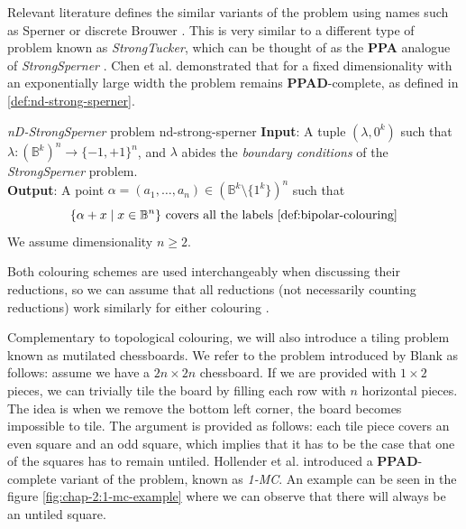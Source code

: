 Relevant literature defines the similar variants of the problem using names such as Sperner or discrete Brouwer 
\cite{chen_SettlingComplexityComputing_2009, chen_Complexity2DDiscrete_2009, daskalakis_ComplexityComputingNash_2006, deligkas_PureCircuitTightInapproximability_2024}.
This is very similar to a different type of problem known as \textit{StrongTucker}, which can be thought of as the
\textbf{PPA} analogue of \textit{StrongSperner} \cite{papadimitriou_ComplexityParityArgument_1994,aisenberg_2DTuckerPPA_2020}.
Chen et al. \cite{chen_SettlingComplexityComputing_2009} demonstrated that for a fixed
dimensionality with an exponentially large width the problem remains \textbf{PPAD}-complete,
as defined in \ref{def:nd-strong-sperner}.


\begin{definitionbox}{\textit{nD-StrongSperner} problem \cite{chen_SettlingComplexityComputing_2009,chen_Complexity2DDiscrete_2009}}{nd-strong-sperner}
    \textbf{Input}: A tuple $(\lambda,0^k)$ such that
    $\lambda : (\mathbb{B}^k)^n \to \{-1, +1\}^n$, and $\lambda$ abides the \textit{boundary conditions}
    of the \textit{StrongSperner} problem.\\
    \textbf{Output}: A point $\alpha = (a_1, \hdots, a_n) \in (\mathbb{B}^k \setminus \{1^k\})^n$ such that
    $$
        \{\alpha + x \mid x \in \mathbb{B}^n\} \text{ covers all the labels \ref{def:bipolar-colouring}}
    $$
    We assume dimensionality $n \geq 2$.
\end{definitionbox}

Both colouring schemes are used interchangeably when discussing their reductions,
so we can assume that all reductions (not necessarily counting reductions) work similarly for either colouring
\cite{chen_SettlingComplexityComputing_2009, deligkas_PureCircuitTightInapproximability_2024, daskalakis_ComplexityComputingNash_2006, chen_Complexity2DDiscrete_2009}.

Complementary to topological colouring, we will also introduce a tiling problem known as mutilated chessboards.
We refer
to the problem introduced by Blank \cite{black1946critical} as follows:
assume we have a $2n \times 2n$ chessboard. If we are provided with $1 \times 2$ pieces, we can trivially tile the board by filling each row with $n$ horizontal
pieces. The idea is when we remove the bottom left corner, the board becomes impossible to tile. The argument
is provided as follows: each tile piece covers an even square and an odd square, which implies that it has to be the case that one of the squares
has to remain untiled.
Hollender et al. \cite{hollender_ComplexityMultisourceVariants_2018} introduced a \textbf{PPAD}-complete variant of the problem, known as \textit{1-MC}.
An example can be seen in the figure \ref{fig:chap-2:1-mc-example} where we can observe that there will always be an untiled square.



